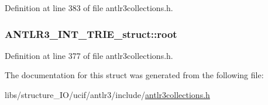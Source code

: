 Definition at line 383 of file antlr3collections.\-h.

\hypertarget{struct_a_n_t_l_r3___i_n_t___t_r_i_e__struct_ae7c1c1e19fcf28e1d0f8da5f943841b1}{
\subsubsection[{root}]{ A\-N\-T\-L\-R3\-\_\-\-I\-N\-T\-\_\-\-T\-R\-I\-E\-\_\-struct\-::root}}\label{struct_a_n_t_l_r3___i_n_t___t_r_i_e__struct_ae7c1c1e19fcf28e1d0f8da5f943841b1}


Definition at line 377 of file antlr3collections.\-h.



The documentation for this struct was generated from the following file\-:\begin{DoxyCompactItemize}
\item 
libs/structure\-\_\-\-I\-O/ucif/antlr3/include/\hyperlink{antlr3collections_8h}{antlr3collections.\-h}\end{DoxyCompactItemize}
